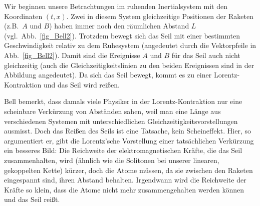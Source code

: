 Wir beginnen unsere Betrachtungen im 
ruhenden Inertialsystem mit den Koordinaten
$(t,x)$. Zwei in diesem System gleichzeitige
Positionen der Raketen (z.B.\ $A$ und $B$) haben
immer noch den r\"aumlichen Abstand $L$ 
(vgl.\ Abb.\ \ref{fig_Bell2}). Trotzdem bewegt
sich das Seil mit einer bestimmten 
Geschwindigkeit relativ zu dem Ruhesystem
(angedeutet durch die Vektorpfeile in
Abb.\ \ref{fig_Bell2}).
Damit sind die Ereignisse $A$ und $B$ 
f\"ur das Seil auch nicht gleichzeitig
(auch die Gleichzeitigkeitslinien zu den
beiden Ereignissen sind in der Abbildung
angedeutet). Da sich das Seil bewegt,
kommt es zu einer Lorentz-Kontraktion und
das Seil wird rei\ss en.

Bell bemerkt, dass damals viele Physiker in der
Lorentz-Kontraktion nur eine scheinbare
Verk\"urzung von Abst\"anden sahen, weil
man eine L\"ange aus verschiedenen Systemen mit
unterschiedlichen Gleichzeitigkeitsvorstellungen
ausmisst. Doch das Rei\ss en des Seils ist
eine Tatsache, kein \glqq Schein\-effekt\grqq. 
Hier, so argumentiert er, gibt die Lorentz'sche
Vorstellung einer tats\"achlichen Verk\"urzung
ein besseres Bild: Die Reichweite der
elektromagnetischen Kr\"afte, die das Seil
zusammenhalten, wird (\"ahnlich wie die
Solitonen bei unserer linearen, gekoppelten
Kette) k\"urzer, doch die Atome m\"ussen,
da sie zwischen den Raketen eingespannt
sind, ihren Abstand behalten. Irgendwann
wird die Reichweite der Kr\"afte so klein, dass
die Atome nicht mehr zusammengehalten werden
k\"onnen und das Seil rei\ss t. 

